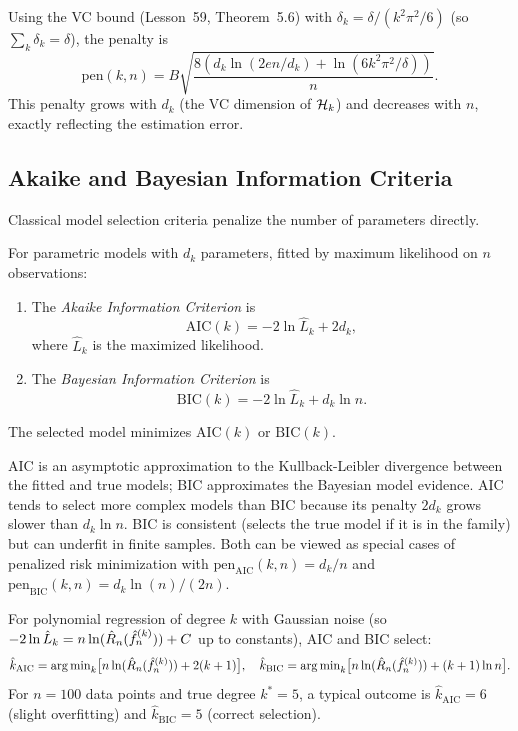 \documentclass[11pt,a4paper]{article}
\begin{document}
\begin{example}
\label{ex:vc_penalty}
Using the VC bound (Lesson~59, Theorem~5.6) with
$\delta_k = \delta/(k^2 \pi^2/6)$ (so $\sum_k \delta_k = \delta$),
the penalty is
\[
    \mathrm{pen}(k, n) = B\sqrt{\frac{8(d_k \ln(2en/d_k)
    + \ln(6k^2 \pi^2/\delta))}{n}}.
\]
This penalty grows with $d_k$ (the VC dimension of $\mathcal{H}_k$)
and decreases with $n$, exactly reflecting the estimation error.
\end{example}

\subsection{Akaike and Bayesian Information Criteria}

Classical model selection criteria penalize the number of parameters
directly.

\begin{definition}
\label{def:aic_bic}
For parametric models with $d_k$ parameters, fitted by maximum
likelihood on $n$ observations:
\begin{enumerate}[nosep,label=(\roman*)]
    \item The \emph{Akaike Information Criterion} \citep{akaike1974}
    is
    \[
        \mathrm{AIC}(k) = -2\ln \hat{L}_k + 2d_k,
    \]
    where $\hat{L}_k$ is the maximized likelihood.
    \item The \emph{Bayesian Information Criterion}
    \citep{schwarz1978} is
    \[
        \mathrm{BIC}(k) = -2\ln \hat{L}_k + d_k \ln n.
    \]
\end{enumerate}
The selected model minimizes $\mathrm{AIC}(k)$ or $\mathrm{BIC}(k)$.
\end{definition}

\begin{remark}
\label{rem:aic_bic}
AIC is an asymptotic approximation to the Kullback-Leibler divergence
between the fitted and true models; BIC approximates the Bayesian
model evidence.  AIC tends to select more complex models than BIC
because its penalty $2d_k$ grows slower than $d_k \ln n$.  BIC is
consistent (selects the true model if it is in the family) but can
underfit in finite samples.  Both can be viewed as special cases of
penalized risk minimization with
$\mathrm{pen}_{\mathrm{AIC}}(k, n) = d_k/n$ and
$\mathrm{pen}_{\mathrm{BIC}}(k, n) = d_k \ln(n)/(2n)$.
\end{remark}

\begin{example}
\label{ex:aic_bic_poly}
For polynomial regression of degree $k$ with Gaussian noise
(so $-2\ln\hat{L}_k = n\ln(\hat{R}_n(\hat{f}_n^{(k)})) + C$
up to constants), AIC and BIC select:
\[
    \hat{k}_{\mathrm{AIC}} = \operatorname{arg\,min}_k
    \bigl[n\ln(\hat{R}_n(\hat{f}_n^{(k)})) + 2(k+1)\bigr],
    \quad
    \hat{k}_{\mathrm{BIC}} = \operatorname{arg\,min}_k
    \bigl[n\ln(\hat{R}_n(\hat{f}_n^{(k)})) + (k+1)\ln n\bigr].
\]
For $n = 100$ data points and true degree $k^* = 5$, a typical
outcome is $\hat{k}_{\mathrm{AIC}} = 6$ (slight overfitting) and
$\hat{k}_{\mathrm{BIC}} = 5$ (correct selection).
\end{example}
\end{document}
